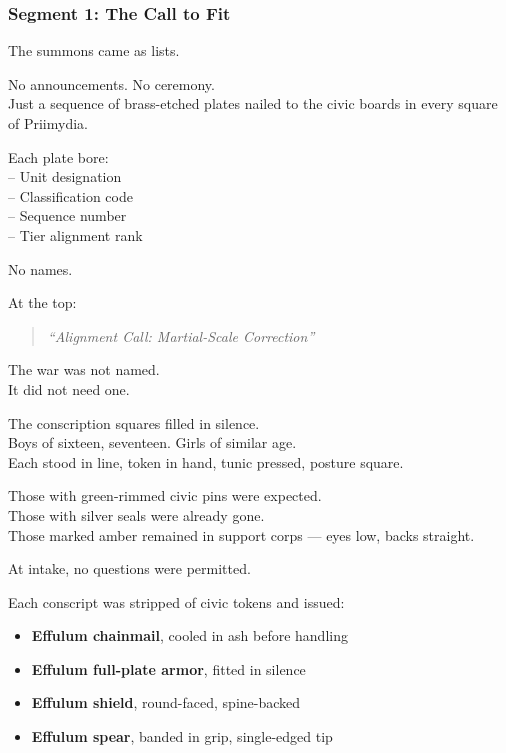 \documentclass[9pt]{article}
\begin{document}
\newpage

\subsubsection*{Segment 1: The Call to Fit}

The summons came as lists.

No announcements. No ceremony.\\
Just a sequence of brass-etched plates nailed to the civic boards in every square of Priimydia.

Each plate bore:\\
\hspace*{1em}-- Unit designation\\
\hspace*{1em}-- Classification code\\
\hspace*{1em}-- Sequence number\\
\hspace*{1em}-- Tier alignment rank

No names.

At the top:

\begin{quote}
\textit{“Alignment Call: Martial-Scale Correction”}
\end{quote}

The war was not named.\\
It did not need one.

\vspace{1em}

The conscription squares filled in silence.\\
Boys of sixteen, seventeen. Girls of similar age.\\
Each stood in line, token in hand, tunic pressed, posture square.

Those with green-rimmed civic pins were expected.\\
Those with silver seals were already gone.\\
Those marked amber remained in support corps — eyes low, backs straight.

\vspace{1em}

At intake, no questions were permitted.

Each conscript was stripped of civic tokens and issued:

\begin{itemize}
\item \textbf{Effulum chainmail}, cooled in ash before handling
\item \textbf{Effulum full-plate armor}, fitted in silence
\item \textbf{Effulum shield}, round-faced, spine-backed
\item \textbf{Effulum spear}, banded in grip, single-edged tip
\end{itemize}
\end{document}
